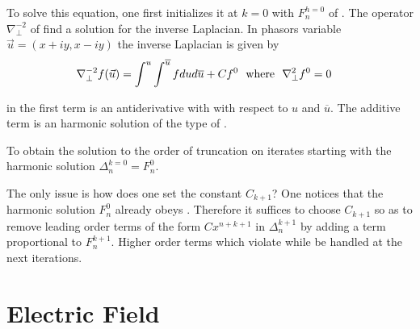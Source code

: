 %
%
To solve this equation, one first initializes it at $k=0$ with 
%
${F}_{n}^{h=
0}$
of . The operator %
${\nabla }_{\perp }^{-2}$ of  find a solution for the inverse Laplacian. In phasors variable 
%
$\vec{u}=
\left({x+iy,x-iy}\right)$
the inverse Laplacian is   given by 
%
\begin{eqnarray}{\nabla }_{\perp }^{-2}f(\vec{u})&=\int_{}^{u}\int_{}^{\overline{u}}f du d\overline{u} + C {f}^{0}~~{\rm w}{\rm h}{\rm e}{\rm r}{\rm e}~~{\nabla }_{\perp }^{2}{f}^{0}=0\label{eq:inv}\end{eqnarray}
%

in  the first term is an antiderivative with with respect to $u$ and $ \overline{u}$. The additive term is an harmonic solution of the type of . 

To obtain the solution to the order of truncation on iterates  starting with the harmonic solution %
${\Delta }_{n}^{k=
0}=
{F}_{n}^{0}$.

The only issue is how does one set the constant ${C}_{k+1}$? One notices that the harmonic solution  ${F}_{n}^{0}$ already obeys . Therefore it suffices to  choose ${C}_{k+1}$ so as to remove leading order terms of the form $C x^{n+k+1}$  in ${\Delta }_{n}^{k+1}$ by adding a term proportional to ${F}_{n}^{k+1}$. Higher order terms which violate  while be handled at the next iterations.


\section{Electric Field}

